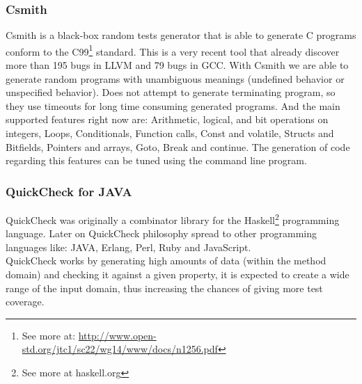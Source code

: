 \subsubsection{Csmith}
Csmith\cite{Yang:2011:FUB:1993316.1993532} is a black-box random tests generator that is able to generate C programs
conform to the C99\footnote{See more at: \url{http://www.open-std.org/jtc1/sc22/wg14/www/docs/n1256.pdf}} standard. This is a very recent tool that already discover
more than 195 bugs in \ac{LLVM} and 79 bugs in \ac{GCC}. With Csmith we are able to generate random programs with unambiguous meanings (undefined behavior or 
unspecified behavior). Does not attempt to generate terminating program, so they use timeouts for long time consuming generated programs.
And the main supported features right now are: Arithmetic, logical, and bit operations on integers, Loops, Conditionals, Function calls, Const and volatile,
Structs and Bitfields, Pointers and arrays, Goto, Break and continue. The generation of code regarding this features can be tuned using the command line program.

\subsubsection{QuickCheck for JAVA}
QuickCheck was originally a combinator library for the Haskell\footnote{See more at haskell.org} programming language\cite{Claessen:2000:QLT:357766.351266}.
Later on QuickCheck philosophy spread to other programming languages like: JAVA, Erlang, Perl, Ruby and JavaScript.\\
QuickCheck works by generating high amounts of data (within the method domain) and checking it against a given property,
it is expected to create a wide range of the input domain, thus increasing the chances of giving more test coverage.
\secendnote
